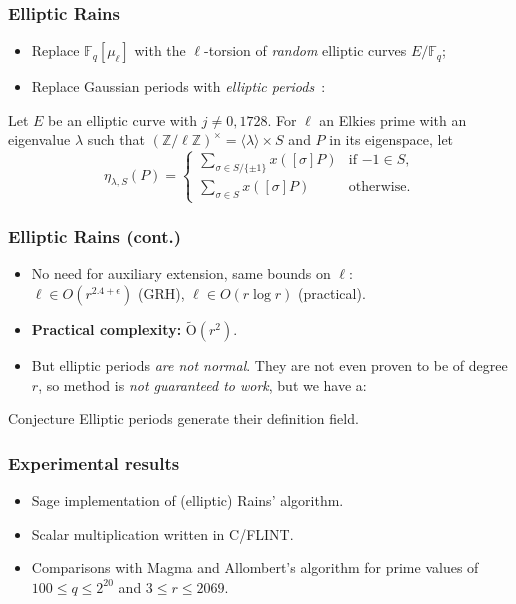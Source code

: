\documentclass[francais]{beamer}
\def\Z {\ensuremath{\mathbb{Z}}}
\def\F {\ensuremath{\mathbb{F}}}
\def\tildO {\ensuremath{\mathrm{\tilde{O}}}}
\begin{document}
\begin{frame}\frametitle{Elliptic Rains}
  \begin{itemize}
  \item Replace $\F_q[\mu_\ell]$ with the $\ell$-torsion of
    \emph{random} elliptic curves $E/\F_q$;
  \item Replace Gaussian periods with \emph{elliptic
      periods}~\cite{mihailescu+morain+schost07}:
  \end{itemize}
  \begin{definition}
    Let $E$ be an elliptic curve with $j\neq0,1728$.
    For $\ell$ an Elkies prime with an eigenvalue $\lambda$
    such that $(\Z/\ell\Z)^{\times} = \langle{\lambda}\rangle \times S$ and $P$ in its eigenspace, let
\[
    \eta_{\lambda,S}(P) =
    \begin{cases}
      \sum_{\sigma\in S/\{\pm1\}} {x \left([\sigma] P \right)} & \text{if $-1\in S$,}\\
      \sum_{\sigma\in S} {x \left([\sigma] P \right)} & \text{otherwise.}
    \end{cases}
  \]
\end{definition}
\end{frame}
\begin{frame}\frametitle{Elliptic Rains (cont.)}
  \begin{itemize}
  \item No need for auxiliary extension, same bounds on $\ell$:\\
    $\ell\in O(r^{2.4+\epsilon})$ (GRH),
    $\ell\in O(r\log r)$ (practical).
  \item \textbf{Practical complexity:} $\tildO\left(r^2\right)$.
  \end{itemize}

  \begin{itemize}
  \item But elliptic periods \emph{are not normal}.
    They are not even proven to be of degree $r$, so method is
    \emph{not guaranteed to work}, but we have a:
  \end{itemize}
  \begin{block}{Conjecture}
    Elliptic periods generate their definition field.
  \end{block}
\end{frame}

\begin{frame}\frametitle{Experimental results}
  \begin{itemize}
  \item Sage implementation of (elliptic) Rains' algorithm.
  \item Scalar multiplication written in C/FLINT.
  \item Comparisons with Magma and Allombert's algorithm for prime values of $100\le q\le 2^{20}$ and $3\le r\le 2069$.
  \end{itemize}
\end{frame}
\end{document}
